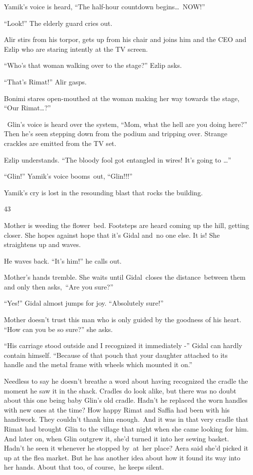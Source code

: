 \documentclass[twoside,11pt]{book}
\begin{document}
Yamik's voice is heard, ``The half-hour countdown
begins{\dots}{\ }NOW!''

``Look!'' The elderly guard cries out.

Alir stirs from his torpor, gets up from his chair and joins him and the CEO and Ezlip who are staring intently at the
TV screen. 

``Who's that woman walking over to the stage?'' Ezlip asks. 

``That's Rimat!'' Alir gasps. 

Bonimi stares open-mouthed at the woman making her way towards the stage, ``Our
Rimat{\dots}?''

~Glin's voice is heard over the system, ``Mom, what the hell are you doing here?'' Then
he{{}'}s seen stepping down from the podium and tripping over. Strange crackles
are emitted from the TV set.

Ezlip understands. ``The bloody fool got entangled in wires! It's going to {\dots}''

``Glin!'' Yamik's voice booms{\ }out,
``Glin!!!''

Yamik's cry is lost in the resounding blast that rocks the building.


\bigskip

43\ 

Mother is weeding the flower\ bed. Footsteps are heard coming up the hill, getting closer. She hopes against hope that
it's Gidal and{\ }no one else. It is! She straightens up and waves. 

He waves back. ``It's him!'' he calls out. 

Mother's hands tremble. She waits until Gidal~closes the distance~between them and only then
asks,{\ }``Are you sure?'' 

``Yes!'' Gidal almost jumps for joy. ``Absolutely sure!'' 

Mother doesn't trust this man who is only guided by the goodness of his heart. ``How can you be so sure?'' she asks.

``His carriage stood outside and I recognized it immediately -'' Gidal can hardly contain
himself. ``Because of that pouch that your daughter attached to its handle and the metal frame with wheels
which mounted it on.''

Needless to say he doesn't breathe a word about having recognized the cradle the moment he saw it in the shack. Cradles
do look alike, but there was no doubt about this one being baby Glin's old cradle. Hadn't he replaced the worn handles
with new ones at the time? How happy Rimat and Saffia had been with his handiwork. They couldn't thank him
enough{.\ }And it was in that very cradle that Rimat had
brought{\ }Glin to the village that night when she came looking for him. And
later on, when Glin outgrew it, she'd turned it into her sewing basket. Hadn't he seen it whenever he stopped
by{\ }at{\ }her place? Aera said she'd picked it up at the flea market. But he has
another idea about how it found its way into her hands. About that too, of course,~he keeps silent.~~
\end{document}

